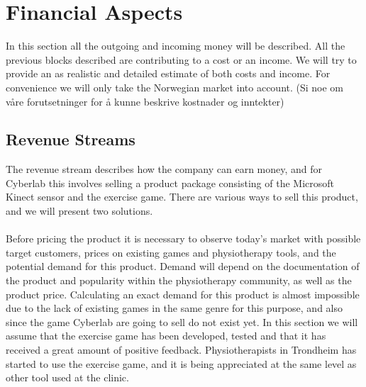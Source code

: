 \section{Financial Aspects}
In this section all the outgoing and incoming money will be described. All the previous blocks described are contributing to a cost or an income. We will try to provide an as realistic and detailed estimate of both costs and income. For convenience we will only take the Norwegian market into account. (Si noe om v{å}re forutsetninger for {å} kunne beskrive kostnader og inntekter)
\subsection{Revenue Streams}
The revenue stream describes how the company can earn money, and for Cyberlab this involves selling a product package consisting of the Microsoft Kinect sensor and the exercise game. There are various ways to sell this product, and we will present two solutions.\\ \\
Before pricing the product it is necessary to observe today's market with possible target customers, prices on existing games and physiotherapy tools, and the potential demand for this product. Demand will depend on the documentation of the product and popularity within the physiotherapy community, as well as the product price. Calculating an exact demand for this product is almost impossible due to the lack of existing games in the same genre for this purpose, and also since the game Cyberlab are going to sell do not exist yet. In this section we will assume that the exercise game has been developed, tested and that it has received a great amount of positive feedback. Physiotherapists in Trondheim has started to use the exercise game, and it is being appreciated at the same level as other tool used at the clinic. \\ \\
